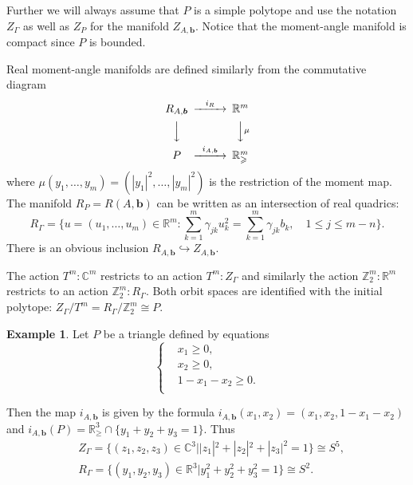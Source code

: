 \documentclass[jsg]{IP_v1_forauthors}
\def\ge{\geqslant}
\def\geq{\geqslant}
\def\le{\leqslant}
\theoremstyle{definition}
\numberwithin{equation}{section}
\newtheorem{exam}{Example}
\begin{document}
Further we will always assume that $P$ is a simple polytope and use the notation $Z_\Gamma$ as well as $Z_P$ for the manifold $Z_{A,\boldsymbol{b}}$. Notice that the moment-angle manifold is compact since $P$ is bounded.

Real moment-angle manifolds are defined similarly from the commutative diagram
\begin{equation}
\begin{CD}
R_{A,\boldsymbol{b}}  @>i_{R}>>                  {\mathbb R}^m \\
@VVV                                              @VV\mu V      \\
P               @>i_{A,\boldsymbol{b}}>>         {\mathbb R}^m_{\geq}
\end{CD}
\end{equation}
where $\mu(y_1,\ldots,y_m)=(|y_1|^2,\ldots,|y_m|^2)$ is the restriction of the moment map. The manifold $R_P = R(A,\boldsymbol{b})$ can be written as an intersection of real quadrics:
\begin{equation}
R_{\Gamma}=\{ u=(u_1,\dots,u_m) \in {\mathbb R}^m : \sum_{k=1}^m \gamma_{jk} u_{k} ^2 = \sum_{k=1}^m \gamma_{jk}b_k, \quad   1 \le j \le m-n \}.
\end{equation}
There is an obvious inclusion  $R_{A,\boldsymbol{b}}  \hookrightarrow  Z_{A,\boldsymbol{b}}$.

The action $T^m : {\mathbb C}^m $ restricts to an action $T^m : Z_\Gamma$ and similarly the action ${\mathbb Z}_2^m : {\mathbb R}^m$ restricts to an action ${\mathbb Z}_2^m : R_\Gamma$. Both orbit spaces are identified with the initial polytope: $Z_\Gamma/T^m = R_\Gamma / {\mathbb Z}_2^m \cong P $.

\begin{exam}
Let $P$ be a triangle defined by equations
\begin{equation}
\left \{
\begin{aligned}
&x_1 \geq 0,\\
&x_2 \geq 0,\\
&1-x_1-x_2 \geq 0.\\
\end{aligned}
\right.
\end{equation}

Then the map $i_{A,\boldsymbol{b}}$ is given by the formula $i_{A,\boldsymbol{b}}(x_1,x_2)=(x_1,x_2,1-x_1-x_2)$ and $i_{A,\boldsymbol{b}}(P)={\mathbb R}^3_\ge \cap \{y_1+y_2+y_3=1\}$. Thus
\begin{equation}
\begin{aligned}
&Z_\Gamma=\{(z_1,z_2,z_3)\in {\mathbb C}^3||z_1|^2+|z_2|^2+|z_3|^2=1 \} \cong S^5,\\
&R_\Gamma=\{(y_1,y_2,y_3)\in {\mathbb R}^3|y_1^2+y_2^2+y_3^2=1 \} \cong S^2.\\
\end{aligned}
\end{equation}

\end{exam}
\end{document}
